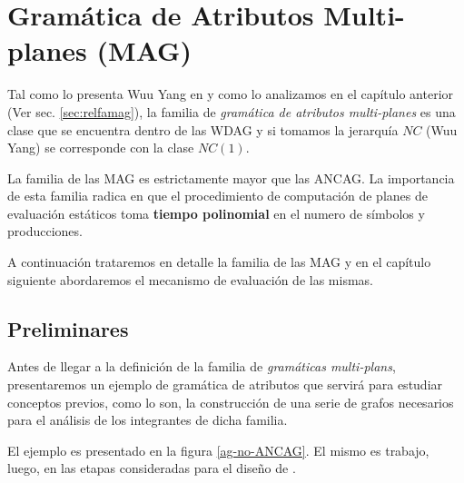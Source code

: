 \chapter{Gramática de Atributos Multi-planes (MAG)}
\label{chap:mag}
\minitoc

Tal como lo presenta Wuu Yang en \cite{wuu-yang1} y como lo analizamos en el capítulo anterior (Ver sec. \ref{sec:relfamag}), la familia de \textit{gramática de atributos multi-planes} es una clase que se encuentra dentro de las WDAG y si tomamos la jerarquía $NC$ (Wuu Yang) se corresponde con la clase $NC(1)$.

La familia de las MAG es estrictamente mayor que las ANCAG. La importancia de esta familia radica en que el procedimiento de computación de planes de evaluación estáticos toma \textbf{tiempo polinomial} en el numero de símbolos y producciones.

A continuación trataremos en detalle la familia de las MAG y en el capítulo siguiente abordaremos el mecanismo de evaluación de las mismas.

\section{Preliminares}
\label{sec:pre-grafos}
Antes de llegar a la definición de la familia de \textit{gramáticas multi-plans}, presentaremos un ejemplo de gramática de atributos que servirá para estudiar conceptos previos, como lo son, la construcción de una serie de grafos necesarios para el análisis de los integrantes de dicha familia.

El ejemplo es presentado en la figura \ref{ag-no-ANCAG}. El mismo es trabajo, luego, en las etapas consideradas para el diseño de \maggen.

